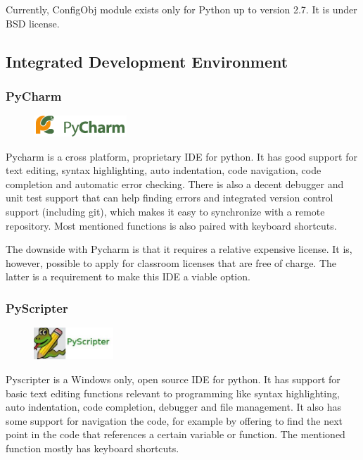 \noindent Currently, ConfigObj module exists only for Python up to version
2.7. It is under BSD license.

\subsection{Integrated Development Environment}

\subsubsection{PyCharm}
\begin{figure}
	\begin{center}
	\vspace{-30pt}
		\includegraphics[width=3.5cm]{./planning/img/pycharm_logo}
	\vspace{-30pt}
	\end{center}
\end{figure}
Pycharm is a cross platform, proprietary IDE for python. It has good support
for text editing, syntax highlighting, auto indentation, code navigation, code
completion and automatic error checking. There is also a decent debugger and
unit test support that can help finding errors and integrated version control
support (including git), which makes it easy to synchronize with a remote
repository. Most mentioned functions is also paired with keyboard shortcuts.

The downside with Pycharm is that it requires a relative expensive license. It
is, however, possible to apply for classroom licenses that are free of charge.
The latter is a requirement to make this IDE a viable option.

\subsubsection{PyScripter}
\begin{figure}
	\begin{center}
	\vspace{-30pt}
		\includegraphics[width=3cm]{./planning/img/pyscripter_logo}
	\vspace{-30pt}
	\end{center}
\end{figure}
Pyscripter is a Windows only, open source IDE for python. It has support for
basic text editing functions relevant to programming like syntax highlighting,
auto indentation, code completion, debugger and file management. It also has
some support for navigation the code, for example by offering to find the next
point in the code that references a certain variable or function. The mentioned
function mostly has keyboard shortcuts.

